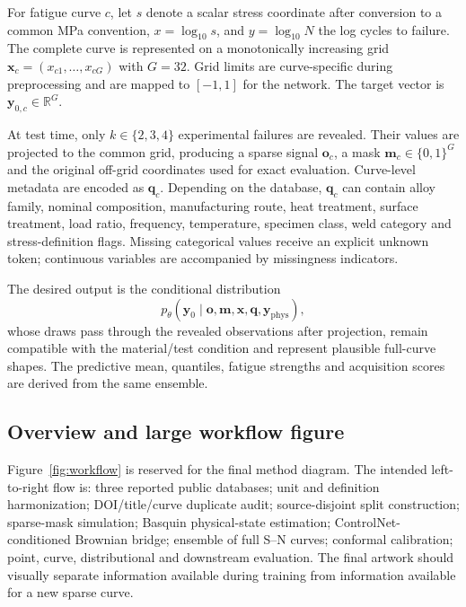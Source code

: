 \documentclass[a4paper,fleqn]{cas-dc}
\newcommand{\vect}[1]{\boldsymbol{#1}}
\begin{document}
For fatigue curve $c$, let $s$ denote a scalar stress coordinate after conversion to a common MPa convention, $x=\log_{10}s$, and $y=\log_{10}N$ the log cycles to failure. The complete curve is represented on a monotonically increasing grid $\vect{x}_c=(x_{c1},\ldots,x_{cG})$ with $G=32$. Grid limits are curve-specific during preprocessing and are mapped to $[-1,1]$ for the network. The target vector is $\vect{y}_{0,c}\in\mathbb{R}^{G}$.

At test time, only $k\in\{2,3,4\}$ experimental failures are revealed. Their values are projected to the common grid, producing a sparse signal $\vect{o}_c$, a mask $\vect{m}_c\in\{0,1\}^{G}$ and the original off-grid coordinates used for exact evaluation. Curve-level metadata are encoded as $\vect{q}_c$. Depending on the database, $\vect{q}_c$ can contain alloy family, nominal composition, manufacturing route, heat treatment, surface treatment, load ratio, frequency, temperature, specimen class, weld category and stress-definition flags. Missing categorical values receive an explicit unknown token; continuous variables are accompanied by missingness indicators.

The desired output is the conditional distribution
\begin{equation}
 p_\theta(\vect{y}_0\mid \vect{o},\vect{m},\vect{x},\vect{q},\vect{y}_{\mathrm{phys}}),
 \label{eq:conditional}
\end{equation}
whose draws pass through the revealed observations after projection, remain compatible with the material/test condition and represent plausible full-curve shapes. The predictive mean, quantiles, fatigue strengths and acquisition scores are derived from the same ensemble.

\subsection{Overview and large workflow figure}

Figure~\ref{fig:workflow} is reserved for the final method diagram. The intended left-to-right flow is: three reported public databases; unit and definition harmonization; DOI/title/curve duplicate audit; source-disjoint split construction; sparse-mask simulation; Basquin physical-state estimation; ControlNet-conditioned Brownian bridge; ensemble of full S--N curves; conformal calibration; point, curve, distributional and downstream evaluation. The final artwork should visually separate information available during training from information available for a new sparse curve.
\end{document}
